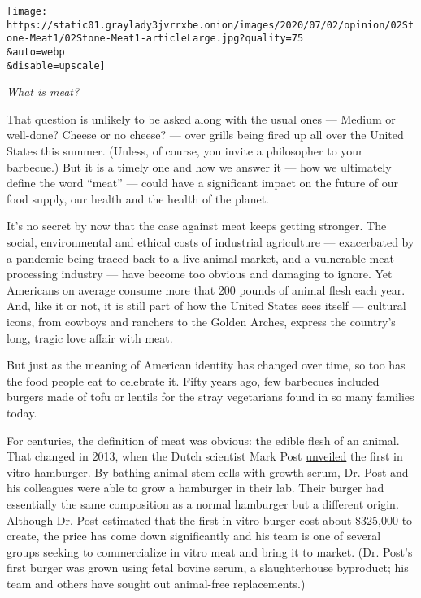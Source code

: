 \texttt{[image: https://static01.graylady3jvrrxbe.onion/images/2020/07/02/opinion/02Stone-Meat1/02Stone-Meat1-articleLarge.jpg?quality=75\\\&auto=webp\\\&disable=upscale]}

\emph{What is meat?}

That question is unlikely to be asked along with the usual ones ---
Medium or well-done? Cheese or no cheese? --- over grills being fired up
all over the United States this summer. (Unless, of course, you invite a
philosopher to your barbecue.) But it is a timely one and how we answer
it --- how we ultimately define the word ``meat'' --- could have a
significant impact on the future of our food supply, our health and the
health of the planet.

It's no secret by now that the case against meat keeps getting stronger.
The social, environmental and ethical costs of industrial agriculture
--- exacerbated by a pandemic being traced back to a live animal market,
and a vulnerable meat processing industry --- have become too obvious
and damaging to ignore. Yet Americans on average consume more that 200
pounds of animal flesh each year. And, like it or not, it is still part
of how the United States sees itself --- cultural icons, from cowboys
and ranchers to the Golden Arches, express the country's long, tragic
love affair with meat.

But just as the meaning of American identity has changed over time, so
too has the food people eat to celebrate it. Fifty years ago, few
barbecues included burgers made of tofu or lentils for the stray
vegetarians found in so many families today.

For centuries, the definition of meat was obvious: the edible flesh of
an animal. That changed in 2013, when the Dutch scientist Mark Post
\href{https://www.nytimes3xbfgragh.onion/2013/05/14/science/engineering-the-325000-in-vitro-burger.html}{unveiled}
the first in vitro hamburger. By bathing animal stem cells with growth
serum, Dr. Post and his colleagues were able to grow a hamburger in
their lab. Their burger had essentially the same composition as a normal
hamburger but a different origin. Although Dr. Post estimated that the
first in vitro burger cost about \$325,000 to create, the price has come
down significantly and his team is one of several groups seeking to
commercialize in vitro meat and bring it to market. (Dr. Post's first
burger was grown using fetal bovine serum, a slaughterhouse byproduct;
his team and others have sought out animal-free replacements.)

